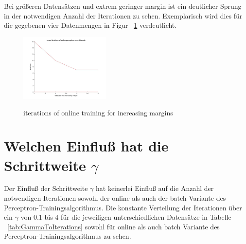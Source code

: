 \documentclass[]{report}
\begin{document}
Bei gr\"o{\ss}eren Datens\"atzen und extrem geringer margin ist ein deutlicher Sprung in der notwendigen Anzahl der Iterationen zu sehen. Exemplarisch wird dies f\"ur die gegebenen vier Datenmengen in Figur ~\ref{fig:meanIterOverDataSets} verdeutlicht.

\begin{figure}[h]
\centering
\includegraphics[width=0.4\textwidth]{./images/meanIterOnlinePercOverDataSets.jpg} \\
\caption{iterations of online training for increasing margins}
\label{fig:meanIterOverDataSets}
\end{figure}  

\section{Welchen Einflu{\ss} hat die Schrittweite $\gamma$}

Der Einflu{\ss} der Schrittweite $\gamma$ hat keinerlei Einflu{\ss} auf die Anzahl der notwendigen Iterationen sowohl der online als auch der batch Variante des Perceptron-Trainingsalgorithmus. Die konstante Verteilung der Iterationen \"uber ein $\gamma$ von 0.1 bis 4 f\"ur die jeweiligen unterschiedlichen Datens\"atze in Tabelle ~\ref{tab:GammaToIterations} sowohl f\"ur online als auch batch Variante des Perceptron-Trainingsalgorithmus zu sehen.
\end{document}
